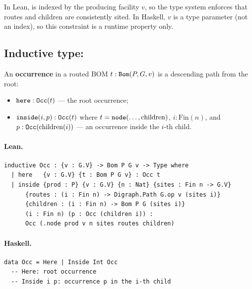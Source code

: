 \documentclass[11pt,a4paper]{article}
\begin{document}
\begin{fidelitynote}
In Lean,  is indexed by the producing facility $v$, so the
type system enforces that routes and children are consistently sited.  In
Haskell, $v$ is a type parameter (not an index), so this constraint is a
runtime property only.
\end{fidelitynote}


\subsection{Inductive type: }

\begin{defn}[Occurrence]
An \textbf{occurrence} in a routed BOM $t : \texttt{Bom}(P, G, v)$ is a
descending path from the root:
\begin{itemize}
  \item $\texttt{here} : \texttt{Occ}(t)$ --- the root occurrence;
  \item $\texttt{inside}(i, p) : \texttt{Occ}(t)$ where $t =
    \texttt{node}(\ldots, \mathrm{children})$, $i : \mathrm{Fin}(n)$, and
    $p : \texttt{Occ}(\mathrm{children}(i))$ --- an occurrence inside the $i$-th
    child.
\end{itemize}
\end{defn}

\paragraph{Lean.}
\begin{lstlisting}[style=lean]
inductive Occ : {v : G.V} -> Bom P G v -> Type where
  | here   {v : G.V} {t : Bom P G v} : Occ t
  | inside {prod : P} {v : G.V} {n : Nat} {sites : Fin n -> G.V}
      {routes : (i : Fin n) -> Digraph.Path G.op v (sites i)}
      {children : (i : Fin n) -> Bom P G (sites i)}
      (i : Fin n) (p : Occ (children i)) :
      Occ (.node prod v n sites routes children)
\end{lstlisting}

\paragraph{Haskell.}
\begin{lstlisting}[style=haskell]
data Occ = Here | Inside Int Occ
  -- Here: root occurrence
  -- Inside i p: occurrence p in the i-th child
\end{lstlisting}
\end{document}
